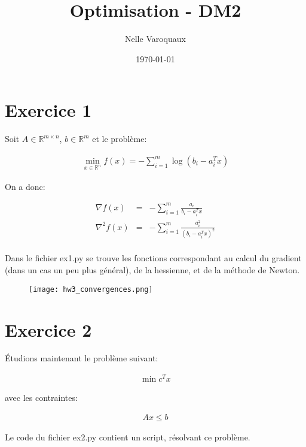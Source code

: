 \documentclass{article}
\date{\today}
\title{Optimisation - DM2}
\author{Nelle Varoquaux}
\begin{document}
\maketitle

\section{Exercice 1}

Soit $A \in \mathbb{R}^{m \times n}$, $b \in \mathbb{R}^m$ et le problème:

\begin{align}
\min_{x \in \mathbb{R}^n} f(x) = - \sum_{i = 1}^{m}\log(b_i - a_i^T x)
\end{align}


On a donc:

\begin{align*}
\nabla f(x) & = & - \sum_{i = 1}^m \frac{a_i}{b_i - a_i^T x} \\
\nabla^2 f(x) & = & - \sum_{i = 1}^m \frac{a_i^2}{(b_i - a_i^T x)^2} \\
\end{align*}

Dans le fichier ex1.py se trouve les fonctions correspondant au calcul du
gradient (dans un cas un peu plus général), de la hessienne, et de la méthode
de Newton.

\begin{figure}
\begin{center}
\texttt{[image: hw3\_convergences.png]}
\end{center}
\end{figure}

\section{Exercice 2}

Étudions maintenant le problème suivant:

\begin{align*}
\min c^Tx
\end{align*}

avec les contraintes:

\begin{align*}
Ax \leq b
\end{align*}

Le code du fichier ex2.py contient un script, résolvant ce problème.
\end{document}
